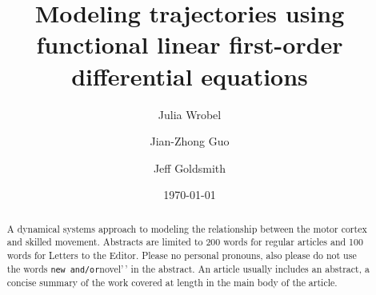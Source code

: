 \documentclass[preprint]{JASA}
\begin{document}

\title[]{Modeling trajectories using functional linear first-order
differential equations}



\author{Julia Wrobel}

\author{Jian-Zhong Guo}


\author{Jeff Goldsmith}







\date{\today}

\begin{abstract}
A dynamical systems approach to modeling the relationship between the
motor cortex and skilled movement. Abstracts are limited to 200 words
for regular articles and 100 words for Letters to the Editor. Please no
personal pronouns, also please do not use the words
\texttt{new\textquotesingle{}\textquotesingle{}\ and/or}novel'\,' in the
abstract. An article usually includes an abstract, a concise summary of
the work covered at length in the main body of the article.
\end{abstract}
\end{document}
